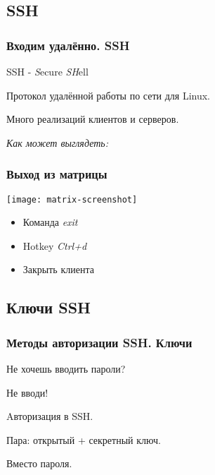 \subsection{SSH}

\begin{frame}
  \frametitle{Входим удалённо. SSH}

  \begin{center}

    SSH - \emph{S}ecure \emph{SH}ell
    \newline \pause

    Протокол удалённой работы по сети для Linux.

    Много реализаций клиентов и серверов. 
    \newline
    \pause

    \emph{Как может выглядеть:} 
    \newline
    \emph{ }
  \end{center} 

\end{frame}

\begin{frame}
  \frametitle{Выход из матрицы}
  
  \begin{center}
    \texttt{[image: matrix-screenshot]}
    \pause
    \newline
    \begin{itemize}
      \item Команда \emph{exit}
      \item Hotkey \emph{Ctrl+d}
      \item Закрыть клиента
    \end{itemize}
  \end{center}

\end{frame}

\subsection{Ключи SSH}

\begin{frame}
  \frametitle{Методы авторизации SSH. Ключи}

  \alert{Не хочешь вводить пароли?}
  \pause

  \alert{Не вводи!} 
  \pause

  \begin{center}
    Aвторизация в SSH.
    
    Пара: открытый + секретный ключ. 
    
    Вместо пароля.
  \end{center}

\end{frame}

